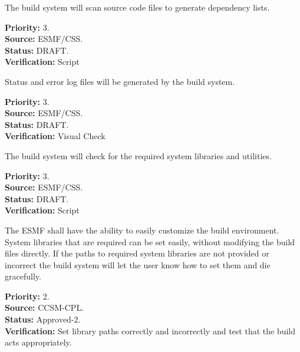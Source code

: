 The build system will scan source code files to 
generate dependency lists.
\begin{reqlist}
{\bf Priority:} 3. \\
{\bf Source:} ESMF/CSS. \\
{\bf Status:} DRAFT. \\
{\bf Verification:} Script
\end{reqlist}

Status and error log files will be generated by 
the build system.
\begin{reqlist}
{\bf Priority:} 3. \\
{\bf Source:} ESMF/CSS. \\
{\bf Status:} DRAFT. \\
{\bf Verification:} Visual Check
\end{reqlist}

The build system will check for the required system 
libraries and utilities.
\begin{reqlist}
{\bf Priority:} 3. \\
{\bf Source:} ESMF/CSS. \\
{\bf Status:} DRAFT. \\
{\bf Verification:} Script
\end{reqlist}

The ESMF shall have the ability to easily customize the build environment. 
System libraries that are required can be set easily, without modifying 
the build files directly. If the paths to required system libraries 
are not provided or incorrect the build system will let the user know 
how to set them and die gracefully.
\begin{reqlist}
{\bf Priority:} 2. \\
{\bf Source:} CCSM-CPL. \\
{\bf Status:} Approved-2. \\
{\bf Verification:} Set library paths correctly and incorrectly and test that 
the build acts appropriately.
\end{reqlist}
